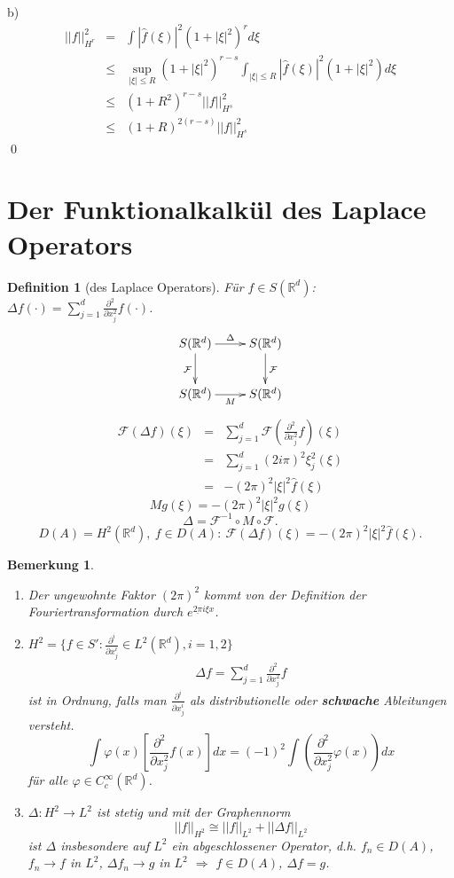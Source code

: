 \documentclass[12pt]{extreport} %
\newtheorem{Definition}[Satz]{Definition}
\newtheorem{Bemerkung}[Satz]{Bemerkung}
\numberwithin{equation}{section}
\newcommand{\R}{\mathbb{R}} %
\newcommand{\f}{\hat{f}}
\newcommand{\F}{\mathcal{F}}
\newcommand{\m}{\cdot}
\begin{document}
	b) 
	\begin{eqnarray}
		||f||_{H^r}^2 &=& \int |\f(\xi)|^2(1+|\xi|^2)^rd\xi\nonumber\\
		&\leq& \sup_{|\xi|\leq R}(1+|\xi|^2)^{r-s}\int_{|\xi|\leq R}|\f(\xi)|^2(1+|\xi|^2)d\xi\nonumber\\
		&\leq& (1+R^2)^{r-s}||f||_{H^s}^2\nonumber\\
		&\leq& (1+R)^{2(r-s)}||f||_{H^s}^2\nonumber
	\end{eqnarray}
	\qed
	
	
	\section{Der Funktionalkalkül des Laplace Operators}
	
	\begin{Definition}[des Laplace Operators]
		Für $f\in S(\R^d)$: $\Delta f(\m)=\sum_{j = 1}^{d}\frac{\partial^2}{\partial x_j^2} f(\m)$. 
		$$\xymatrix{
			S(\R^d)\ar[r]^{\Delta}\ar[d]_{\F} & S(\R^d)\ar[d]^{\F}\\
			S(\R^d)\ar[r]_M & S(\R^d)
			}$$
		\begin{eqnarray}
			\F(\Delta f)(\xi) &=& \sum_{j = 1}^{d}\F(\frac{\partial^2}{\partial x_j^2}f)(\xi) \nonumber\\
			&=& \sum_{j = 1}^d (2i\pi)^2\xi_j^2 (\xi)\nonumber\\
			&=& -(2\pi)^2 |\xi|^2 \f(\xi)\nonumber
		\end{eqnarray}
		$$Mg(\xi) = -(2\pi)^2|\xi|^2 g(\xi)$$
		$$\boxed{\Delta= \F^{-1}\circ M\circ \F.}$$
		$$D(A) = H^2(\R^d),~ f\in D(A):~ \F(\Delta f)(\xi) = -(2\pi)^2|\xi|^2\f(\xi).$$
	\end{Definition}
	
	\begin{Bemerkung}
		~
		\begin{enumerate}
			\item[a)] Der ungewohnte Faktor $(2\pi)^2$ kommt von der Definition der Fouriertransformation durch $e^{\underline{2\pi}i\xi x}$.
			\item[b)] $H^2 = \{f\in S': \frac{\partial^i}{\partial x_j^i}\in L^2(\R^d), i=1,2 \}$
			\begin{eqnarray}
				\Delta f = \sum_{j = 1}^d \frac{\partial^2}{\partial x_j^2} f\nonumber
			\end{eqnarray}
			ist in Ordnung, falls man $\frac{\partial^i}{\partial x_j^i}$ als distributionelle oder \textbf{schwache} Ableitungen versteht. 
			$$\int \varphi(x)\left[\frac{\partial^2}{\partial x_j^2} f(x)\right]dx = (-1)^{2}\int\left(\frac{\partial^2}{\partial x_j^2} \varphi(x) \right)dx$$
			für alle $\varphi\in C_c^\infty(\R^d)$.
			\item[c)] $\Delta: H^2\rightarrow L^2$ ist stetig und mit der Graphennorm
			$$||f||_{H^2}\cong ||f||_{L^2} + ||\Delta f||_{L^2}$$
			ist $\Delta$ insbesondere auf $L^2$ ein abgeschlossener Operator, d.h. $f_n\in D(A)$, $f_n\rightarrow f$ in $L^2$, $\Delta f_n\rightarrow g$ in $L^2$ $\Rightarrow$ $f\in D(A)$, $\Delta f = g$.
		\end{enumerate}
	\end{Bemerkung}
	
\end{document}
